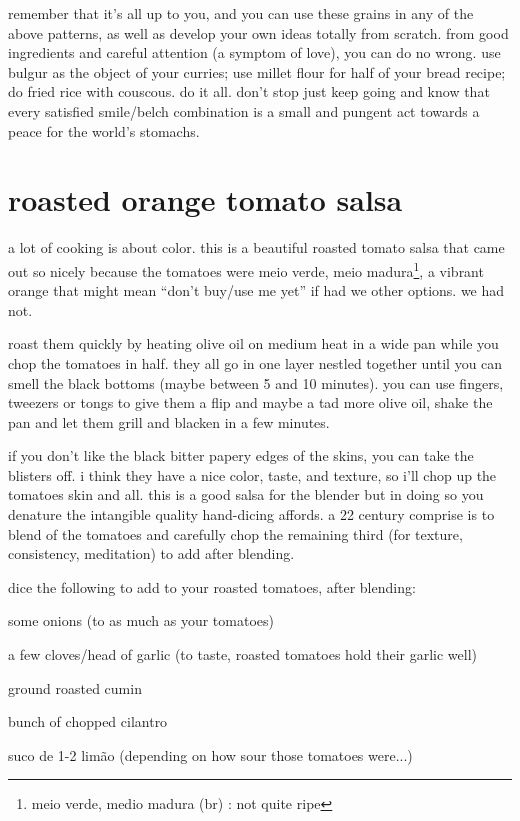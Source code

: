 remember that it's all up to you, and you can use these grains in any of the 
above patterns, as well as develop your own ideas totally from scratch. from 
good ingredients and careful attention (a symptom of love), you can do no 
wrong. use bulgur as the object of your curries; use millet flour for half of 
your bread recipe; do fried rice with couscous. do it all. don't stop just 
keep going and know that every satisfied smile/belch combination is a small 
and pungent act towards a peace for the world's stomachs.

\section{roasted orange tomato salsa}

a lot of cooking is about color. this is a beautiful roasted tomato salsa that 
came out so nicely because the tomatoes were meio verde, meio 
madura\footnote{meio verde, medio madura (br) : not quite ripe}, a vibrant 
orange that might mean ``don't buy/use me yet'' if had we other options. we 
had not.

roast them quickly by heating olive oil on medium heat in a wide pan while you 
chop the tomatoes in half. they all go in one layer nestled together until you 
can smell the black bottoms (maybe between 5 and 10 minutes). you can use 
fingers, tweezers or tongs to give them a flip and maybe a tad more olive oil, 
shake the pan and let them grill and blacken in a few minutes.

if you don't like the black bitter papery edges of the skins, you can take the 
blisters off. i think they have a nice color, taste, and texture, so i'll chop 
up the tomatoes skin and all. this is a good salsa for the blender but in 
doing so you denature the intangible quality hand-dicing affords. a 
22 century comprise is to blend \twothirds of the tomatoes and 
carefully chop the remaining third (for texture, consistency, meditation) to 
add after blending.

dice the following to add to your roasted tomatoes, after blending:

\begin{ingredients}
  \item some onions (\onehalf to \onethird as much as your tomatoes)
  \item a few cloves/head of garlic (to taste, roasted tomatoes hold their garlic well)
  \item ground roasted cumin
  \item \onehalf bunch of chopped cilantro
  \item suco de 1-2 lim\~{a}o (depending on how sour those tomatoes were...)
\end{ingredients}

